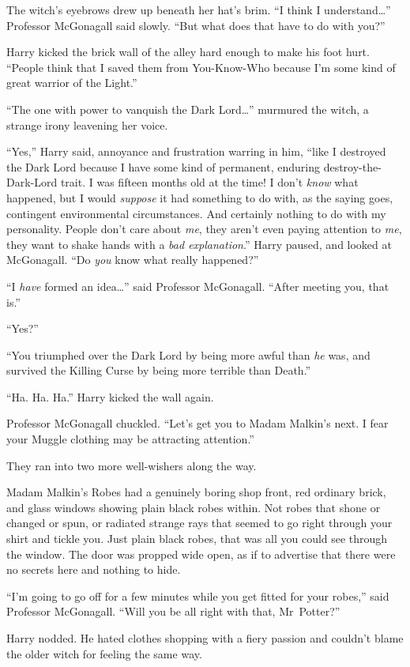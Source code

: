 The witch’s eyebrows drew up beneath her hat’s brim.
“I think I understand…” Professor McGonagall said slowly.
“But what does that have to do with you?”

Harry kicked the brick wall of the alley hard enough to make his foot hurt.
“People think that I saved them from You-Know-Who because I’m some kind of great warrior of the Light.”

“The one with power to vanquish the Dark Lord…” murmured the witch, a strange irony leavening her voice.

“Yes,” Harry said, annoyance and frustration warring in him, “like I destroyed the Dark Lord because I have some kind of permanent, enduring destroy-the-Dark-Lord trait. I was fifteen months old at the time! I don’t \emph{know} what happened, but I would \emph{suppose} it had something to do with, as the saying goes, contingent environmental circumstances. And certainly nothing to do with my personality. People don’t care about \emph{me}, they aren’t even paying attention to \emph{me}, they want to shake hands with a \emph{bad explanation}.” Harry paused, and looked at McGonagall.
“Do \emph{you} know what really happened?”

“I \emph{have} formed an idea…” said Professor McGonagall.
“After meeting you, that is.”

“Yes?”

“You triumphed over the Dark Lord by being more awful than \emph{he} was, and survived the Killing Curse by being more terrible than Death.”

“Ha. Ha. Ha.” Harry kicked the wall again.

Professor McGonagall chuckled.
“Let’s get you to Madam Malkin’s next. I fear your Muggle clothing may be attracting attention.”

They ran into two more well-wishers along the way.

Madam Malkin’s Robes had a genuinely boring shop front, red ordinary brick, and glass windows showing plain black robes within. Not robes that shone or changed or spun, or radiated strange rays that seemed to go right through your shirt and tickle you. Just plain black robes, that was all you could see through the window. The door was propped wide open, as if to advertise that there were no secrets here and nothing to hide.

“I’m going to go off for a few minutes while you get fitted for your robes,” said Professor McGonagall.
“Will you be all right with that, Mr~Potter?”

Harry nodded. He hated clothes shopping with a fiery passion and couldn’t blame the older witch for feeling the same way.

